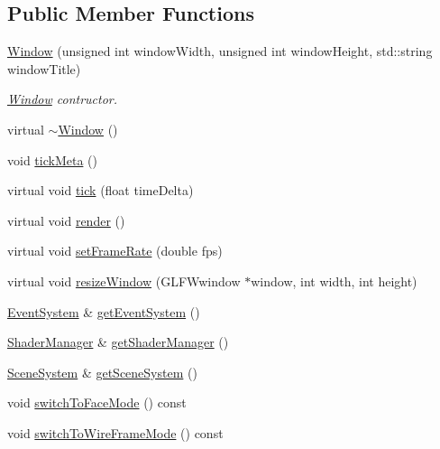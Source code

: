 \subsection*{Public Member Functions}
\begin{DoxyCompactItemize}
\item 
\mbox{\hyperlink{classec_1_1_window_a01bb029fa4964caf70553c5ca806d8cc}{Window}} (unsigned int window\+Width, unsigned int window\+Height, std\+::string window\+Title)
\begin{DoxyCompactList}\small\item\em \mbox{\hyperlink{classec_1_1_window}{Window}} contructor. \end{DoxyCompactList}\item 
virtual \mbox{\hyperlink{classec_1_1_window_a639d3f230ca0e232066b4c61a5a212b7}{$\sim$\+Window}} ()
\item 
void \mbox{\hyperlink{classec_1_1_window_a0adaafc13d0dafc238aa0aaa0f5f4f82}{tick\+Meta}} ()
\item 
virtual void \mbox{\hyperlink{classec_1_1_window_a093b4989e4cd12cf9e62777ec4ef8661}{tick}} (float time\+Delta)
\item 
virtual void \mbox{\hyperlink{classec_1_1_window_acb066b817adc7c790b0810695078dee3}{render}} ()
\item 
virtual void \mbox{\hyperlink{classec_1_1_window_a6acc36f2c069b5e38f522953ca52ce9f}{set\+Frame\+Rate}} (double fps)
\item 
virtual void \mbox{\hyperlink{classec_1_1_window_a33ef071f4198715ae42844c681fb40eb}{resize\+Window}} (G\+L\+F\+Wwindow $\ast$window, int width, int height)
\item 
\mbox{\hyperlink{classec_1_1_event_system}{Event\+System}} \& \mbox{\hyperlink{classec_1_1_window_a9dda11a247352aa51fea720076174535}{get\+Event\+System}} ()
\item 
\mbox{\hyperlink{classec_1_1_shader_manager}{Shader\+Manager}} \& \mbox{\hyperlink{classec_1_1_window_adc63f54684ad3681c0d4bea8481b6322}{get\+Shader\+Manager}} ()
\item 
\mbox{\hyperlink{classec_1_1_scene_system}{Scene\+System}} \& \mbox{\hyperlink{classec_1_1_window_a13d8cba249c2de0a5366c2507e887290}{get\+Scene\+System}} ()
\item 
void \mbox{\hyperlink{classec_1_1_window_a071d133719298221af21bd2c207733b3}{switch\+To\+Face\+Mode}} () const
\item 
void \mbox{\hyperlink{classec_1_1_window_a85be553f3f877b77ac70db32b9f8a8f6}{switch\+To\+Wire\+Frame\+Mode}} () const

\end{DoxyCompactItemize}
